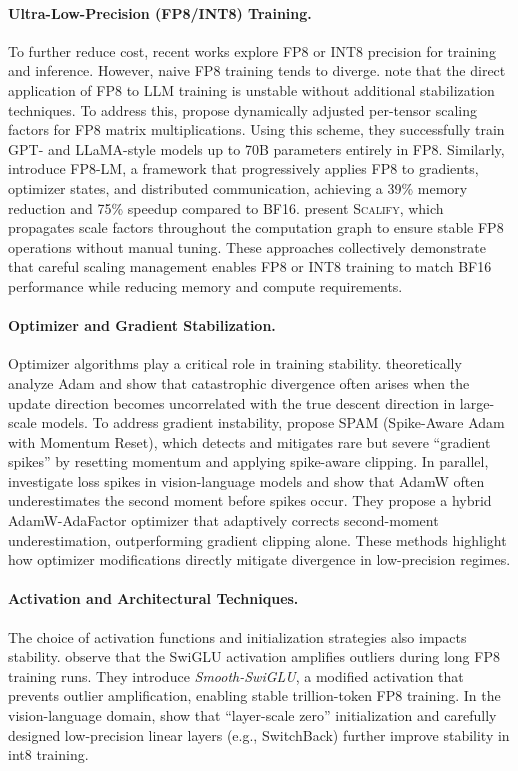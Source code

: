 \documentclass{article} %
\begin{document}
\paragraph{Ultra-Low-Precision (FP8/INT8) Training.}
To further reduce cost, recent works explore FP8 or INT8 precision for training and inference.
However, naive FP8 training tends to diverge. \citet{lee2024fp8} note that the direct application of FP8 to LLM training is unstable without additional stabilization techniques.
To address this, \citet{perez2023training} propose dynamically adjusted per-tensor scaling factors for FP8 matrix multiplications. 
Using this scheme, they successfully train GPT- and LLaMA-style models up to 70B parameters entirely in FP8.
Similarly, \citet{peng2023fp8} introduce \textsc{FP8-LM}, a framework that progressively applies FP8 to gradients, optimizer states, and distributed communication, achieving a 39\% memory reduction and 75\% speedup compared to BF16.
\citet{balancca2024scalify} present \textsc{Scalify}, which propagates scale factors throughout the computation graph to ensure stable FP8 operations without manual tuning.
These approaches collectively demonstrate that careful scaling management enables FP8 or INT8 training to match BF16 performance while reducing memory and compute requirements.

\paragraph{Optimizer and Gradient Stabilization.}
Optimizer algorithms play a critical role in training stability.
\citet{molybog2023theory} theoretically analyze Adam and show that catastrophic divergence often arises when the update direction becomes uncorrelated with the true descent direction in large-scale models.
To address gradient instability, \citet{huang2025spam} propose \textsc{SPAM} (Spike-Aware Adam with Momentum Reset), which detects and mitigates rare but severe ``gradient spikes'' by resetting momentum and applying spike-aware clipping. 
In parallel, \citet{wortsman2023stable} investigate loss spikes in vision-language models and show that AdamW often underestimates the second moment before spikes occur. 
They propose a hybrid AdamW-AdaFactor optimizer that adaptively corrects second-moment underestimation, outperforming gradient clipping alone.
These methods highlight how optimizer modifications directly mitigate divergence in low-precision regimes.

\paragraph{Activation and Architectural Techniques.}
The choice of activation functions and initialization strategies also impacts stability.
\citet{fishman2024scaling} observe that the SwiGLU activation amplifies outliers during long FP8 training runs. They introduce \textit{Smooth-SwiGLU}, a modified activation that prevents outlier amplification, enabling stable trillion-token FP8 training.
In the vision-language domain, \citet{wortsman2023stable} show that ``layer-scale zero'' initialization and carefully designed low-precision linear layers (e.g., SwitchBack) further improve stability in int8 training.
\end{document}
